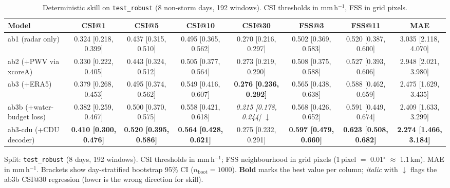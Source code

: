 \begin{table}[t]
\centering
\small
\caption{Deterministic skill on \texttt{test\_robust} (8 non-storm days, 192 windows). CSI thresholds in mm\,h$^{-1}$, FSS in grid pixels.}
\label{tab:test_robust}
\begin{tabular}{lccccccc}
\toprule
Model & CSI@1 & CSI@5 & CSI@10 & CSI@30 & FSS@3 & FSS@11 & MAE \\
\midrule
ab1 (radar only) & 0.324 [0.218, 0.399] & 0.437 [0.315, 0.510] & 0.495 [0.365, 0.562] & 0.270 [0.216, 0.297] & 0.502 [0.369, 0.583] & 0.520 [0.387, 0.600] & 3.035 [2.118, 4.070] \\
ab2 (+PWV via xcoreA) & 0.330 [0.222, 0.405] & 0.443 [0.324, 0.512] & 0.505 [0.377, 0.564] & 0.273 [0.219, 0.290] & 0.508 [0.375, 0.588] & 0.527 [0.393, 0.606] & 2.948 [2.021, 3.980] \\
ab3 (+ERA5) & 0.379 [0.268, 0.453] & 0.495 [0.374, 0.562] & 0.549 [0.416, 0.607] & \textbf{0.276 [0.236, 0.292]} & 0.565 [0.438, 0.638] & 0.588 [0.462, 0.659] & 2.475 [1.629, 3.435] \\
ab3b (+water-budget loss) & 0.382 [0.259, 0.467] & 0.500 [0.370, 0.575] & 0.558 [0.421, 0.618] & \textit{0.215 [0.178, 0.244] $\downarrow$} & 0.568 [0.426, 0.652] & 0.591 [0.449, 0.674] & 2.409 [1.633, 3.299] \\
ab3-cdu (+CDU decoder) & \textbf{0.410 [0.300, 0.476]} & \textbf{0.520 [0.395, 0.586]} & \textbf{0.564 [0.428, 0.621]} & 0.275 [0.232, 0.291] & \textbf{0.597 [0.479, 0.660]} & \textbf{0.623 [0.508, 0.682]} & \textbf{2.274 [1.466, 3.184]} \\
\bottomrule
\end{tabular}
\par\medskip
\footnotesize Split: \texttt{test_robust} (8 days, 192 windows). CSI thresholds in mm\,h$^{-1}$; FSS neighbourhood in grid pixels (1\,pixel $=$ 0.01$^\circ$ $\approx$ 1.1\,km). MAE in mm\,h$^{-1}$. Brackets show day-stratified bootstrap 95\% CI ($n_{\text{boot}} = 1000$). \textbf{Bold} marks the best value per column; \textit{italic} with $\downarrow$ flags the ab3b CSI@30 regression (lower is the wrong direction for skill).
\end{table}
